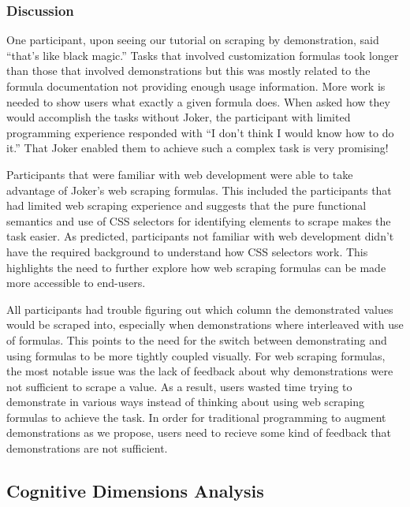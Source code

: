 \documentclass[sigconf,10pt]{acmart}
\begin{document}
\hypertarget{discussion}{%
\subsubsection{Discussion}\label{discussion}}

One participant, upon seeing our tutorial on scraping by demonstration,
said ``that's like black magic.'' Tasks that involved customization
formulas took longer than those that involved demonstrations but this
was mostly related to the formula documentation not providing enough
usage information. More work is needed to show users what exactly a
given formula does. When asked how they would accomplish the tasks
without Joker, the participant with limited programming experience
responded with ``I don't think I would know how to do it.'' That Joker
enabled them to achieve such a complex task is very promising!

Participants that were familiar with web development were able to take
advantage of Joker's web scraping formulas. This included the
participants that had limited web scraping experience and suggests that
the pure functional semantics and use of CSS selectors for identifying
elements to scrape makes the task easier. As predicted, participants not
familiar with web development didn't have the required background to
understand how CSS selectors work. This highlights the need to further
explore how web scraping formulas can be made more accessible to
end-users.

All participants had trouble figuring out which column the demonstrated
values would be scraped into, especially when demonstrations where
interleaved with use of formulas. This points to the need for the switch
between demonstrating and using formulas to be more tightly coupled
visually. For web scraping formulas, the most notable issue was the lack
of feedback about why demonstrations were not sufficient to scrape a
value. As a result, users wasted time trying to demonstrate in various
ways instead of thinking about using web scraping formulas to achieve
the task. In order for traditional programming to augment demonstrations
as we propose, users need to recieve some kind of feedback that
demonstrations are not sufficient.

\hypertarget{cognitive-dimensions-analysis}{%
\subsection{Cognitive Dimensions
Analysis}\label{cognitive-dimensions-analysis}}
\end{document}
